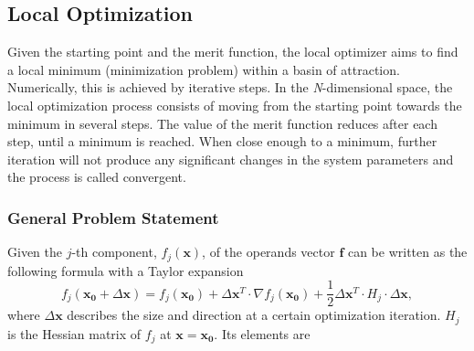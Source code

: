 \subsection{Local Optimization}
\vspace{1em}
Given the starting point and the merit function, the local optimizer aims to find a local minimum (minimization problem) within a basin of attraction. Numerically, this is achieved by iterative steps. In the \textit{N}-dimensional space, the local optimization process consists of moving from the starting point towards the minimum in several steps. The value of the merit function reduces after each step, until a minimum is reached. When close enough to a minimum, further iteration will not produce any significant changes in  the system parameters and the process is called convergent. \newline

\subsubsection{General Problem Statement}

Given the $j$-th component, $f_{j}(\pmb{x})$, of the operands vector $\pmb{f}$ can be written as the following formula with a Taylor expansion 
\begin{equation} \label{mf_taylor_expansion}
f_{j}(\pmb{x_0}+\Delta\pmb{x}) = f_{j}(\pmb{x_0}) + \Delta\pmb{x}^T\cdot \nabla f_{j}(\pmb{x_0}) +\frac{1}{2}\Delta\pmb{x}^T\cdot H_{j} \cdot \Delta\pmb{x},
\end{equation} where $\Delta\pmb{x}$ describes the size and direction at a certain optimization iteration. $H_j$ is the Hessian matrix of $f_j$ at $\pmb{x} = \pmb{x_0}$. Its elements are \newline

